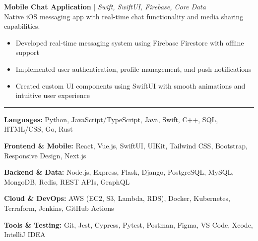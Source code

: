 \documentclass[11pt]{article}
\newcommand{\sectionhead}[1]{\vspace{0.4em}\noindent{\large\bfseries #1}\vspace{0.15em}\hrule\vspace{0.4em}}
\newenvironment{tightitemize}{\begin{itemize}[leftmargin=1.5em,topsep=0pt,itemsep=1pt,parsep=0pt,partopsep=0pt]}{\end{itemize}}
\begin{document}
\vspace{0.3em}
\noindent\textbf{Mobile Chat Application} | \emph{Swift, SwiftUI, Firebase, Core Data}\\
Native iOS messaging app with real-time chat functionality and media sharing capabilities.
\begin{tightitemize}
  \item Developed real-time messaging system using Firebase Firestore with offline support
  \item Implemented user authentication, profile management, and push notifications
  \item Created custom UI components using SwiftUI with smooth animations and intuitive user experience
\end{tightitemize}

\sectionhead{Technical Skills}
\noindent\textbf{Languages:} Python, JavaScript/TypeScript, Java, Swift, C++, SQL, HTML/CSS, Go, Rust

\noindent\textbf{Frontend \& Mobile:} React, Vue.js, SwiftUI, UIKit, Tailwind CSS, Bootstrap, Responsive Design, Next.js

\noindent\textbf{Backend \& Data:} Node.js, Express, Flask, Django, PostgreSQL, MySQL, MongoDB, Redis, REST APIs, GraphQL

\noindent\textbf{Cloud \& DevOps:} AWS (EC2, S3, Lambda, RDS), Docker, Kubernetes, Terraform, Jenkins, GitHub Actions

\noindent\textbf{Tools \& Testing:} Git, Jest, Cypress, Pytest, Postman, Figma, VS Code, Xcode, IntelliJ IDEA
\end{document}
